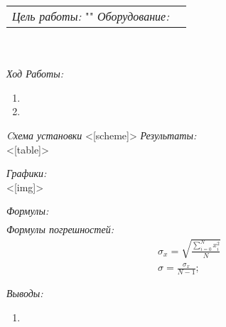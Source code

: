 
\usepackage[utf8]{inputenc}
\usepackage[OT1]{fontenc}
\usepackage{graphicx}
\usepackage{multirow}
\usepackage[left=2cm,right=2cm,top=2cm,bottom=2cm]{geometry}



\maketitle

\begin{tabular}{p{12cm} l}
\textit{Цель работы:\newline} "" \newline \newline
\textit{Оборудование:\newline}  
\end{tabular}\\ \\

\textit{Ход Работы:}
\begin{enumerate}
  \item 
  \item 
\end{enumerate}

\textit{Cхема установки}
<[scheme]>
\textit{Результаты:\\}
<[table]>

\textit{Графики:\\}
<[img]>

\textit{Формулы:}
\begin{align*}

\end{align*}
\textit{Формулы погрешностей:}
\begin{align*}
  & \sigma_x = \sqrt{\frac{\sum\limits_{i=0}^{N}x_i^2}{N}} \\
  & \sigma = \frac{\sigma_x}{N-1};%
\end{align*}

\textit{Выводы:\\}
\begin{enumerate}
  \item 
\end{enumerate}
